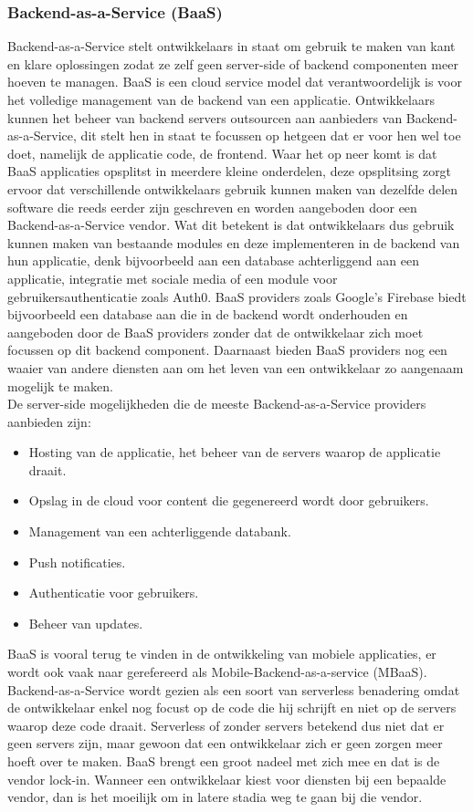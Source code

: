 \subsubsection{Backend-as-a-Service (BaaS)}
Backend-as-a-Service stelt ontwikkelaars in staat om gebruik te maken van kant en klare oplossingen zodat ze zelf geen server-side of backend componenten meer hoeven te managen. BaaS is een cloud service model dat verantwoordelijk is voor het volledige management van  de backend van een applicatie. Ontwikkelaars kunnen het beheer van backend servers outsourcen aan aanbieders van Backend-as-a-Service, dit stelt hen in staat te focussen op hetgeen dat er voor hen wel toe doet, namelijk de applicatie code, de frontend. Waar het op neer komt is dat BaaS applicaties opsplitst in meerdere kleine onderdelen, deze opsplitsing zorgt ervoor dat verschillende ontwikkelaars gebruik kunnen maken van dezelfde delen software die reeds eerder zijn geschreven en worden aangeboden door een Backend-as-a-Service vendor. Wat dit betekent is dat ontwikkelaars dus gebruik kunnen maken van bestaande modules en deze implementeren in de backend van hun applicatie, denk bijvoorbeeld aan een database achterliggend aan een applicatie, integratie met sociale media of een module voor gebruikersauthenticatie zoals Auth0. BaaS providers zoals Google's Firebase biedt bijvoorbeeld een database aan die in de backend wordt onderhouden en aangeboden door de BaaS providers zonder dat de ontwikkelaar zich moet focussen op dit backend component. Daarnaast bieden BaaS providers nog een waaier van andere diensten aan om het leven van een ontwikkelaar zo aangenaam mogelijk te maken.
\\
De server-side mogelijkheden die de meeste Backend-as-a-Service providers aanbieden zijn:
\begin{itemize}
    \item Hosting van de applicatie, het beheer van de servers waarop de applicatie draait.
    \item Opslag in de cloud voor content die gegenereerd wordt door gebruikers.
    \item Management van een achterliggende databank.
    \item Push notificaties.
    \item Authenticatie voor gebruikers.
    \item Beheer van updates.
\end{itemize}
BaaS is vooral terug te vinden in de ontwikkeling van mobiele applicaties, er wordt ook vaak naar gerefereerd als Mobile-Backend-as-a-service (MBaaS). Backend-as-a-Service wordt gezien als een soort van serverless benadering omdat de ontwikkelaar enkel nog focust op de code die hij schrijft en niet op de servers waarop deze code draait. Serverless of zonder servers betekend dus niet dat er geen servers zijn, maar gewoon dat een ontwikkelaar zich er geen zorgen meer hoeft over te maken. BaaS brengt een groot nadeel met zich mee en dat is de vendor lock-in. Wanneer een ontwikkelaar kiest voor diensten bij een bepaalde vendor, dan is het moeilijk om in latere stadia weg te gaan bij die vendor.\autocite{Cloudflare2019} 

